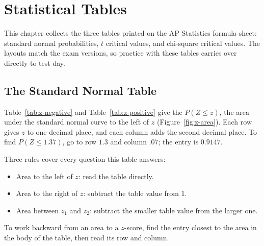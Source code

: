 \chapter{Statistical Tables}

This chapter collects the three tables printed on the AP Statistics formula sheet: standard normal probabilities, $t$ critical values, and chi-square critical values. The layouts match the exam versions, so practice with these tables carries over directly to test day.  

\section{The Standard Normal Table}

Table~\ref{tab:z-negative} and Table~\ref{tab:z-positive} give the  $P(Z \le z)$, the area under the standard normal curve to the left of $z$ (Figure~\ref{fig:z-area}). Each row gives $z$ to one decimal place, and each column adds the second decimal place. To find $P(Z \le 1.37)$, go to row $1.3$ and column $.07$; the entry is $0.9147$.

Three rules cover every question this table answers:

\begin{itemize}
    \item Area to the left of $z$: read the table directly.
    \item Area to the right of $z$: subtract the table value from 1.
    \item Area between $z_1$ and $z_2$: subtract the smaller table value from the larger one.
\end{itemize}

To work backward from an area to a $z$-score, find the entry closest to the area in the body of the table, then read its row and column.

